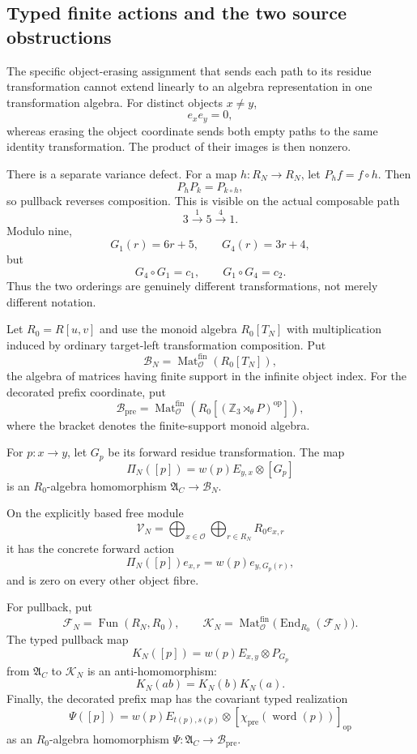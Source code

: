 \subsection{Typed finite actions and the two source obstructions}
\label{subsec:typed-finite-actions}

The specific object-erasing assignment that sends each path to its residue
transformation cannot extend linearly to an algebra representation in one
transformation algebra.  For distinct objects $x\ne y$,
\[
 e_xe_y=0,
\]
whereas erasing the object coordinate sends both empty paths to the same
identity transformation.  The product of their images is then nonzero.

There is a separate variance defect.  For a map $h:R_N\to R_N$, let
$P_hf=f\circ h$.  Then
\[
 P_hP_k=P_{k\circ h},
\]
so pullback reverses composition.  This is visible on the actual composable
path
\[
 3\xrightarrow{1}5\xrightarrow{4}1.
\]
Modulo nine,
\[
 G_1(r)=6r+5,
 \qquad G_4(r)=3r+4,
\]
but
\[
 G_4\circ G_1=c_1,
 \qquad G_1\circ G_4=c_2.
\]
Thus the two orderings are genuinely different transformations, not merely
different notation.

Let $R_0=R[u,v]$ and use the monoid algebra $R_0[T_N]$ with multiplication
induced by ordinary target-left transformation composition.  Put
\[
 \mathcal B_N=\operatorname{Mat}^{\mathrm{fin}}_{\mathcal O}(R_0[T_N]),
\]
the algebra of matrices having finite support in the infinite object index.
For the decorated prefix coordinate, put
\[
 \mathcal B_{\mathrm{pre}}
 =\operatorname{Mat}^{\mathrm{fin}}_{\mathcal O}
   \left(R_0\left[(\mathbb Z_3\rtimes_\theta P)^{\mathrm{op}}\right]\right),
\]
where the bracket denotes the finite-support monoid algebra.

\begin{proposition}
\label{prop:weighted-typed-representations}
For $p:x\to y$, let $G_p$ be its forward residue transformation.  The map
\begin{equation}
\label{eq:typed-forward-representation}
 \Pi_N([p])=w(p)E_{y,x}\otimes[G_p]
\end{equation}
is an $R_0$-algebra homomorphism
$\mathfrak A_C\to\mathcal B_N$.

On the explicitly based free module
\[
 \mathcal V_N=\bigoplus_{x\in\mathcal O}
     \bigoplus_{r\in R_N}R_0e_{x,r}
\]
it has the concrete forward action
\[
 \Pi_N([p])e_{x,r}=w(p)e_{y,G_p(r)},
\]
and is zero on every other object fibre.

For pullback, put
\[
 \mathcal F_N=\operatorname{Fun}(R_N,R_0),
 \qquad
 \mathcal K_N=
 \operatorname{Mat}^{\mathrm{fin}}_{\mathcal O}
   \bigl(\operatorname{End}_{R_0}(\mathcal F_N)\bigr).
\]
The typed pullback map
\[
 K_N([p])=w(p)E_{x,y}\otimes P_{G_p}
\]
from $\mathfrak A_C$ to $\mathcal K_N$ is an anti-homomorphism:
\[
 K_N(ab)=K_N(b)K_N(a).
\]
Finally, the decorated prefix map has the covariant typed realization
\[
 \Psi([p])
 =w(p)E_{t(p),s(p)}\otimes
   [\chi_{\mathrm{pre}}(\operatorname{word}(p))]_{\mathrm{op}}
\]
as an $R_0$-algebra homomorphism
$\Psi:\mathfrak A_C\to\mathcal B_{\mathrm{pre}}$.
\end{proposition}

